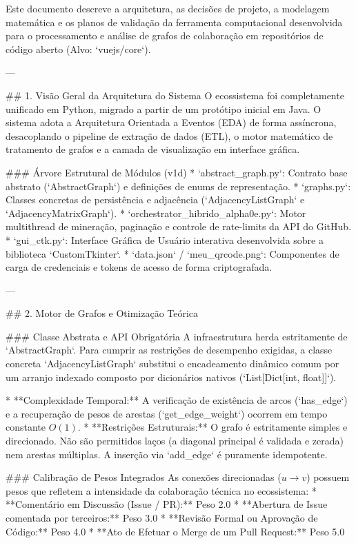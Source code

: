 
Este documento descreve a arquitetura, as decisões de projeto, a modelagem matemática e os planos de validação da ferramenta computacional desenvolvida para o processamento e análise de grafos de colaboração em repositórios de código aberto (Alvo: `vuejs/core`).

---

## 1. Visão Geral da Arquitetura do Sistema
O ecossistema foi completamente unificado em Python, migrado a partir de um protótipo inicial em Java. O sistema adota a Arquitetura Orientada a Eventos (EDA) de forma assíncrona, desacoplando o pipeline de extração de dados (ETL), o motor matemático de tratamento de grafos e a camada de visualização em interface gráfica.

### Árvore Estrutural de Módulos (v1d)
* `abstract_graph.py`: Contrato base abstrato (`AbstractGraph`) e definições de enums de representação.
* `graphs.py`: Classes concretas de persistência e adjacência (`AdjacencyListGraph` e `AdjacencyMatrixGraph`).
* `orchestrator_hibrido_alpha0e.py`: Motor multithread de mineração, paginação e controle de rate-limits da API do GitHub.
* `gui_ctk.py`: Interface Gráfica de Usuário interativa desenvolvida sobre a biblioteca `CustomTkinter`.
* `data.json` / `meu_qrcode.png`: Componentes de carga de credenciais e tokens de acesso de forma criptografada.

---

## 2. Motor de Grafos e Otimização Teórica

### Classe Abstrata e API Obrigatória
A infraestrutura herda estritamente de `AbstractGraph`. Para cumprir as restrições de desempenho exigidas, a classe concreta `AdjacencyListGraph` substitui o encadeamento dinâmico comum por um arranjo indexado composto por dicionários nativos (`List[Dict[int, float]]`).

* **Complexidade Temporal:** A verificação de existência de arcos (`has_edge`) e a recuperação de pesos de arestas (`get_edge_weight`) ocorrem em tempo constante $O(1)$.
* **Restrições Estruturais:** O grafo é estritamente simples e direcionado. Não são permitidos laços (a diagonal principal é validada e zerada) nem arestas múltiplas. A inserção via `add_edge` é puramente idempotente.

### Calibração de Pesos Integrados
As conexões direcionadas ($u \rightarrow v$) possuem pesos que refletem a intensidade da colaboração técnica no ecossistema:
* **Comentário em Discussão (Issue / PR):** Peso 2.0
* **Abertura de Issue comentada por terceiros:** Peso 3.0
* **Revisão Formal ou Aprovação de Código:** Peso 4.0
* **Ato de Efetuar o Merge de um Pull Request:** Peso 5.0

